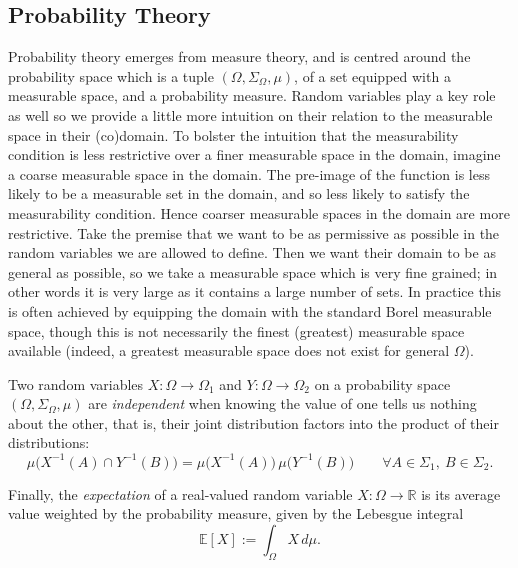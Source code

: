\subsection{Probability Theory}
\label{sec:indep}
Probability theory emerges from measure theory, and is centred around the probability space which is a tuple $(\Omega, \Sigma_\Omega, \mu)$, of a set equipped with a measurable space,
and a probability measure. Random variables play a key role as well so we provide a little more intuition on their relation to the measurable space in their (co)domain. 
To bolster the intuition that the measurability condition is less restrictive over a finer measurable space in the domain, imagine a coarse measurable space in the domain. The pre-image
of the function is less likely to be a measurable set in the domain, and so less likely to satisfy the measurability condition. Hence coarser measurable spaces in the domain are more restrictive.
Take the premise that we want to be as permissive as possible in the random variables we are allowed to define. Then we want their domain to be as general as possible, so we take a measurable space which is very 
fine grained; in other words it is very large as it
contains a large number of sets. In practice this is often achieved by equipping the domain with the standard Borel measurable space, though this is not necessarily the finest (greatest) measurable space available
(indeed, a greatest measurable space does not exist for general $\Omega$).

Two random variables $X : \Omega \rightarrow \Omega_1$ and $Y : \Omega \rightarrow \Omega_2$ on a probability space $(\Omega, \Sigma_\Omega, \mu)$ are
\emph{independent} when knowing the value of one tells us nothing about the other, that is, their joint distribution factors into the
product of their distributions:
\[
\mu\big(X^{-1}(A) \cap Y^{-1}(B)\big) = \mu\big(X^{-1}(A)\big)\,\mu\big(Y^{-1}(B)\big) \qquad \forall A \in \Sigma_1,\ B \in \Sigma_2.
\]

Finally, the \emph{expectation} of a real-valued random variable $X : \Omega \rightarrow \mathbb{R}$ is its average value weighted by the
probability measure, given by the Lebesgue integral
\[
\mathbb{E}[X] := \int_{\Omega} X \,d\mu.
\]




